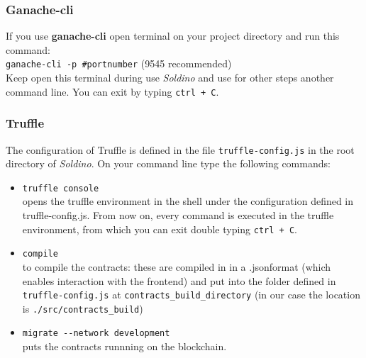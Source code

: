 \subsubsection{Ganache-cli}
If you use \textbf{ganache-cli} open terminal on your project directory and run this command: \\
\texttt{ganache-cli -p \#portnumber} (9545 recommended)\\
Keep open this terminal during use \textit{Soldino} and use for other steps another command line.
You can exit by typing \texttt{ctrl + C}.

\subsubsection{Truffle}
The configuration of Truffle is defined in the file \texttt{truffle-config.js} in the root directory of \textit{Soldino}.
On your command line type the following commands:
\begin{itemize}
	\item \texttt{truffle console}\\
	opens the truffle environment in the shell under the configuration defined in truffle-config.js. From now on, every command is executed in the truffle environment, from which you can exit double typing \texttt{ctrl + C}.
	\item \texttt{compile}\\
	to compile the contracts: these are compiled in in a .json\glosp format (which enables interaction with the frontend) and put into the folder defined in \texttt{truffle-config.js} at \texttt{contracts\_build\_directory} (in our case the location is \texttt{./src/contracts\_build})
	\item \texttt{migrate -{}-network development}\\
	puts the contracts runnning on the blockchain\glo. 
\end{itemize}


